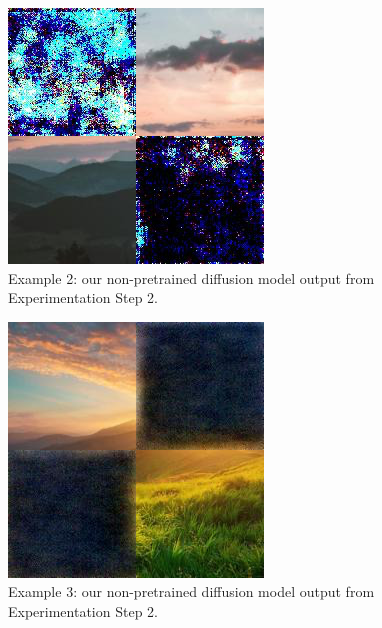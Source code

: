 \documentclass[sigconf]{acmart}
\begin{document}
\begin{figure}[h!]
    \centering
    \includegraphics[width=\linewidth]{diffusion_step_2_2}
    \caption{Example 2: our non-pretrained diffusion model output from Experimentation Step 2.}
    \label{fig:diffusion_step_2_2}
\end{figure}

\begin{figure}[h!]
    \centering
    \includegraphics[width=\linewidth]{diffusion_step_2_3}
    \caption{Example 3: our non-pretrained diffusion model output from Experimentation Step 2.}
    \label{fig:diffusion_step_2_3}
\end{figure}
\end{document}

